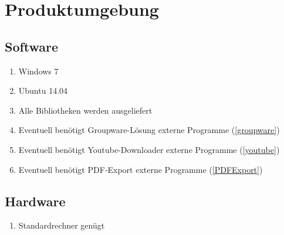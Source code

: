 
\section{Produktumgebung}

\subsection{Software}
\begin{enumerate}[{/SW}1{/}]
\item Windows 7
\item Ubuntu 14.04
\item Alle Bibliotheken werden ausgeliefert
\item Eventuell benötigt Groupware-Lösung externe Programme (\ref{groupware})
\item Eventuell benötigt Youtube-Downloader externe Programme (\ref{youtube})
\item Eventuell benötigt PDF-Export externe Programme (\ref{PDFExport})
\end{enumerate}

\subsection{Hardware}
\begin{enumerate}[{/HW}1{/}]
\item Standardrechner genügt
\end{enumerate}